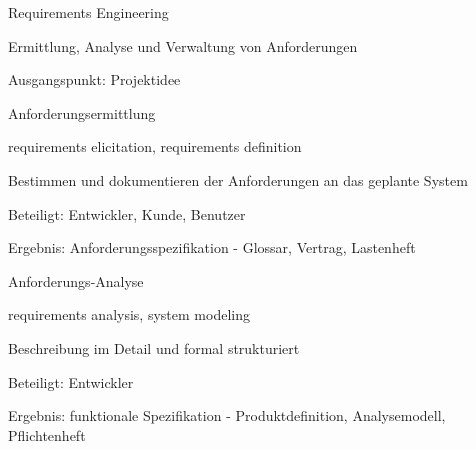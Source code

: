 \documentclass[a4paper]{article}
\begin{document}
\begin{multicols}{3}
  \begin{itemize*}
    \item Requirements Engineering
          \begin{itemize*}
            \item Ermittlung, Analyse und Verwaltung von Anforderungen
            \item Ausgangspunkt: Projektidee
          \end{itemize*}
    \item Anforderungsermittlung
          \begin{itemize*}
            \item requirements elicitation, requirements definition
            \item Bestimmen und dokumentieren der Anforderungen an das geplante System
            \item Beteiligt: Entwickler, Kunde, Benutzer
            \item Ergebnis: Anforderungsspezifikation - Glossar, Vertrag, Lastenheft
          \end{itemize*}
    \item Anforderungs-Analyse
          \begin{itemize*}
            \item requirements analysis, system modeling
            \item Beschreibung im Detail und formal strukturiert
            \item Beteiligt: Entwickler
            \item Ergebnis: funktionale Spezifikation - Produktdefinition, Analysemodell, Pflichtenheft
          \end{itemize*}
  \end{itemize*}




\end{multicols}
\end{document}
